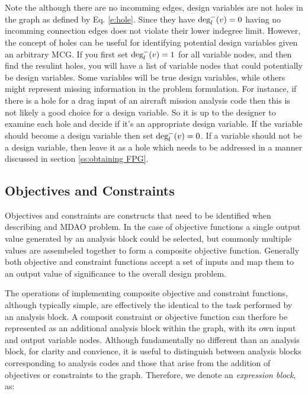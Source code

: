 Note the although there are no incomming edges, design variables are not holes 
in the graph as defined by Eq. \ref{e:hole}. Since they have $\textrm{deg}_l^-(v)=0$ 
having no incomming connection edges does not violate their lower indegree limit. 
However, the concept of holes can be useful for identifying potential design variables
given an arbitrary MCG. If you first set $\textrm{deg}_l^-(v)=1$ for all variable nodes, 
and then find the resulint holes, you will have a list of variable nodes that 
could potentially be design variables. Some variables will be true design variables, 
while others might represent missing information in the problem formulation. For 
instance, if there is a hole for a drag input of an aircraft mission analysis code 
then this is not likely a good choice for a design variable. So it is up to the designer to 
examine each hole and decide if it's an appropriate design variable. If 
the variable should become a design variable then set $\textrm{deg}_l^-(v)=0$. 
If a variable should not be a design variable, then leave it as a hole which 
needs to be addressed in a manner discussed in section \ref{ss:obtaining FPG}.
 

\subsection{Objectives and Constraints}
\label{ss:objectives and constraints}
Objectives and constraints are constructs that need to be identified when 
describing and MDAO problem. In the case of objective functions a single output 
value generated by an analysis block could be selected, but commonly multiple 
values are assembeled together to form a composite objective function. 
Generally both objective and constraint functions accept a set of inputs and map 
them to an output value of significance to the overall design problem. 

The operations of implementing composite objective and constraint functions, 
although typically simple, are effectively the identical to the task performed by an 
analysis block. A composit constraint or objective function can therfore 
be represented as an additional analysis block within the graph, with its own input and 
output variable nodes. Although fundamentally no different than an analysis block, 
for clarity and convience, it is useful to distinguish between analysis 
blocks corresponding to analysis codes and those that arise from the addition of 
objectives or constraints to the graph. Therefore, we denote an \emph{expression block}, as: 

